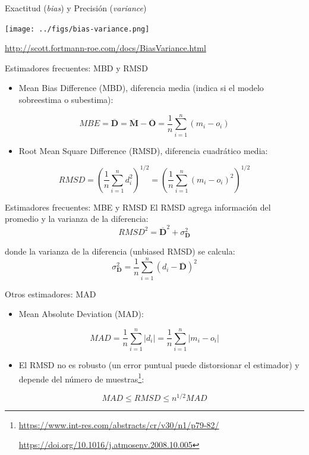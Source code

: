 \documentclass[aspectratio=169, usenames,svgnames,dvipsnames]{beamer}
\begin{document}
\begin{frame}[label={sec:org43a2dc3}]{Exactitud (\emph{bias}) y Precisión (\emph{variance})}
\begin{center}
\texttt{[image: ../figs/bias-variance.png]}
\end{center}

\url{http://scott.fortmann-roe.com/docs/BiasVariance.html}
\end{frame}

\begin{frame}[label={sec:orgdec4dc1}]{Estimadores frecuentes: MBD y RMSD}
\begin{itemize}
\item Mean Bias Difference (MBD), diferencia media (indica si el modelo sobreestima o subestima):
\end{itemize}
\[
MBE = \overline{\mathbf{D}} = \overline{\mathbf{M}} - \overline{\mathbf{O}} = \frac{1}{n} \sum_{i=1}^n (m_i - o_i)
\]

\begin{itemize}
\item Root Mean Square Difference (RMSD), diferencia cuadrático media:
\end{itemize}
\[
RMSD = \left(\frac{1}{n} \sum_{i=1}^n d_i^2 \right)^{1/2} =  \left( \frac{1}{n} \sum_{i=1}^n (m_i - o_i)^2  \right)^{1/2}
\]
\end{frame}

\begin{frame}[label={sec:org4d74768}]{Estimadores frecuentes: MBE y RMSD}
El RMSD agrega información del promedio y la varianza de la
  diferencia:
\[
RMSD^2= \overline{\mathbf{D}}^2 + \sigma^2_{\mathbf{D}} 
\]

donde la varianza de la diferencia (unbiased RMSD) se calcula:
\[
\sigma^2_{\mathbf{D}} = \frac{1}{n} \sum_{i=1}^n (d_i - \overline{\mathbf{D}})^2
\]
\end{frame}


\begin{frame}[label={sec:org5eb0de7}]{Otros estimadores: MAD}
\begin{itemize}
\item Mean Absolute Deviation (MAD):
\end{itemize}

\[
MAD = \frac{1}{n} \sum_{i=1}^n \left|d_i\right| =  \frac{1}{n} \sum_{i=1}^n \left|m_i - o_i\right|
\]
\begin{itemize}
\item El RMSD no es robusto (un error puntual puede distorsionar el estimador) y depende del número de muestras\footnote{\url{https://www.int-res.com/abstracts/cr/v30/n1/p79-82/}

\url{https://doi.org/10.1016/j.atmosenv.2008.10.005}}:
\end{itemize}
\[
MAD \leq RMSD \leq n^{1/2} MAD
\]
\end{frame}
\end{document}
